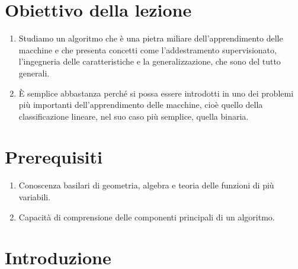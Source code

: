\documentclass[
  letterpaper,
  DIV=11,
  numbers=noendperiod]{scrreprt}
\providecommand{\tightlist}{%
  \setlength{\itemsep}{0pt}\setlength{\parskip}{0pt}}\usepackage{longtable,booktabs,array}
\begin{document}
\section{Obiettivo della lezione}\label{obiettivo-della-lezione}

\begin{enumerate}
\def\labelenumi{\arabic{enumi}.}
\tightlist
\item
  Studiamo un algoritmo che è una pietra miliare dell'apprendimento
  delle macchine e che presenta concetti come l'addestramento
  supervisionato, l'ingegneria delle caratteristiche e la
  generalizzazione, che sono del tutto generali.
\item
  È semplice abbastanza perché si possa essere introdotti in uno dei
  problemi più importanti dell'apprendimento delle macchine, cioè quello
  della classificazione lineare, nel suo caso più semplice, quella
  binaria.
\end{enumerate}

\section{Prerequisiti}\label{prerequisiti}

\begin{enumerate}
\def\labelenumi{\arabic{enumi}.}
\tightlist
\item
  Conoscenza basilari di geometria, algebra e teoria delle funzioni di
  più variabili.
\item
  Capacità di comprensione delle componenti principali di un algoritmo.
\end{enumerate}

\section{Introduzione}\label{introduzione-1}
\end{document}
